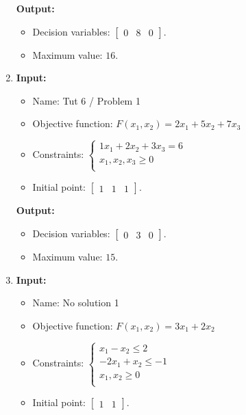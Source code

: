 \documentclass{article}
\begin{document}
\begin{enumerate}[label={(\arabic*)}, itemsep=0.25in]
          \textbf{Output:}
          \begin{itemize}
              \item Decision variables: \(\begin{bmatrix} 0 & 8 & 0 \end{bmatrix}\).
              \item Maximum value: \(16\).
          \end{itemize}

    \item \textbf{Input:}
          \begin{itemize}
              \item Name: Tut 6 / Problem 1
              \item Objective function: \(F(x_1, x_2) = 2 x_1 + 5 x_2 + 7 x_3\)
              \item Constraints: \(\begin{cases}
                        1 x_1 + 2 x_2 + 3 x_3 = 6 \\
                        x_1, x_2, x_3 \ge 0       \\
                    \end{cases}\)
              \item Initial point: \(\begin{bmatrix} 1 & 1 & 1 \end{bmatrix}\).
          \end{itemize}

          \textbf{Output:}
          \begin{itemize}
              \item Decision variables: \(\begin{bmatrix} 0 & 3 & 0 \end{bmatrix}\).
              \item Maximum value: \(15\).
          \end{itemize}

    \item \textbf{Input:}
          \begin{itemize}
              \item Name: No solution 1
              \item Objective function: \(F(x_1, x_2) = 3 x_1 + 2 x_2\)
              \item Constraints: \(\begin{cases}
                        x_1 - x_2 \le 2     \\
                        -2 x_1 + x_2 \le -1 \\
                        x_1, x_2 \ge 0      \\
                    \end{cases}\)
              \item Initial point: \(\begin{bmatrix} 1 & 1\end{bmatrix}\).
          \end{itemize}


\end{enumerate}
\end{document}

